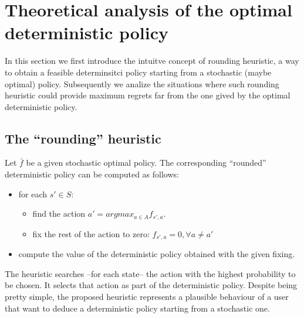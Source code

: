 
\section{Theoretical analysis of the optimal deterministic policy}

In this section we first introduce the intuitve concept of rounding heuristic, a way to obtain a feasible determinsitci policy starting from a stochastic (maybe optimal) policy. Subsequently we analize the situations where such rounding heuristic could provide maximum regrets far from the one gived by the optimal deterministic policy.

\subsection{The ``rounding'' heuristic}

Let $\bar{f}$ be a given stochastic optimal policy. The corresponding ``rounded'' deterministic policy can be computed as follows:
\begin{itemize}
\item for each $s'\in S$:
\begin{itemize}
\item find the action $a' = argmax_{a \in A}f_{s',a}$.
\item fix the rest of the action to zero: $f_{s',a} =0, \forall a \neq a'$
\end{itemize}
\item compute the value of the deterministic policy obtained with the given fixing.
\end{itemize}
 
The heuristic searches --for each state-- the action with the highest probability to be chosen. It selects that action as part of the deterministic policy.
Despite being pretty simple, the proposed heuristic represents a plausible behaviour of a user that want to deduce a deterministic policy starting from a stochastic one.  
%
%
%
%
%
